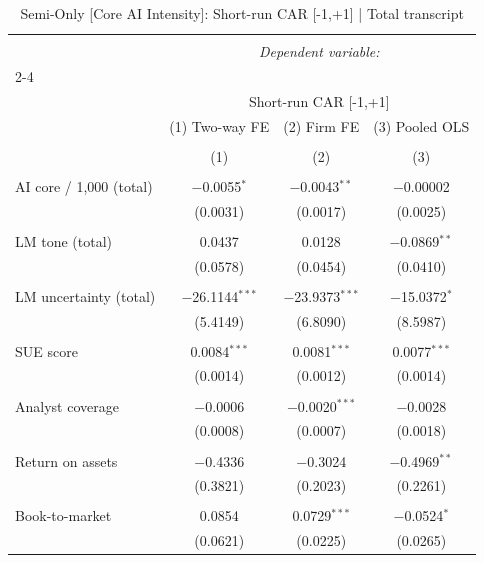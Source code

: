 
\begin{table}[!htbp] \centering 
  \caption{Semi-Only [Core AI Intensity]: Short-run CAR [-1,+1]  |  Total transcript} 
  \label{} 
\begin{tabular}{@{\extracolsep{5pt}}lccc} 
\\[-1.8ex]\hline 
\hline \\[-1.8ex] 
 & \multicolumn{3}{c}{\textit{Dependent variable:}} \\ 
\cline{2-4} 
\\[-1.8ex] & \multicolumn{3}{c}{Short-run CAR [-1,+1]} \\ 
 & (1) Two-way FE & (2) Firm FE & (3) Pooled OLS \\ 
\\[-1.8ex] & (1) & (2) & (3)\\ 
\hline \\[-1.8ex] 
 AI core / 1,000 (total) & $-$0.0055$^{*}$ & $-$0.0043$^{**}$ & $-$0.00002 \\ 
  & (0.0031) & (0.0017) & (0.0025) \\ 
  & & & \\ 
 LM tone (total) & 0.0437 & 0.0128 & $-$0.0869$^{**}$ \\ 
  & (0.0578) & (0.0454) & (0.0410) \\ 
  & & & \\ 
 LM uncertainty (total) & $-$26.1144$^{***}$ & $-$23.9373$^{***}$ & $-$15.0372$^{*}$ \\ 
  & (5.4149) & (6.8090) & (8.5987) \\ 
  & & & \\ 
 SUE score & 0.0084$^{***}$ & 0.0081$^{***}$ & 0.0077$^{***}$ \\ 
  & (0.0014) & (0.0012) & (0.0014) \\ 
  & & & \\ 
 Analyst coverage & $-$0.0006 & $-$0.0020$^{***}$ & $-$0.0028 \\ 
  & (0.0008) & (0.0007) & (0.0018) \\ 
  & & & \\ 
 Return on assets & $-$0.4336 & $-$0.3024 & $-$0.4969$^{**}$ \\ 
  & (0.3821) & (0.2023) & (0.2261) \\ 
  & & & \\ 
 Book-to-market & 0.0854 & 0.0729$^{***}$ & $-$0.0524$^{*}$ \\ 
  & (0.0621) & (0.0225) & (0.0265) \\ 

\end{tabular}
\end{table}
